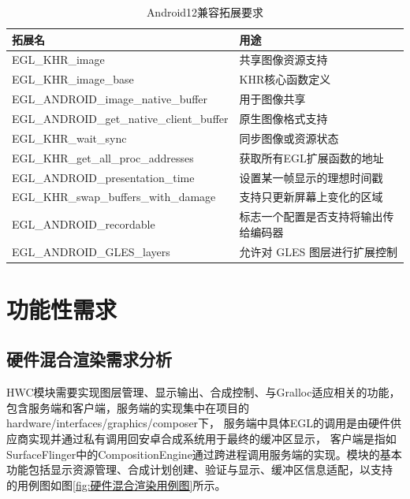 \begin{table}[h]
  \centering
  \caption{Android12兼容拓展要求}
  \label{tab:Android12兼容拓展要求}
  \begin{tabular}{ll}
    \toprule
    拓展名  & 用途\\
    \midrule
    EGL\_KHR\_image & 共享图像资源支持\\
    EGL\_KHR\_image\_base & KHR核心函数定义\\
    EGL\_ANDROID\_image\_native\_buffer & 用于图像共享\\
    EGL\_ANDROID\_get\_native\_client\_buffer & 原生图像格式支持\\
    EGL\_KHR\_wait\_sync & 同步图像或资源状态\\
    EGL\_KHR\_get\_all\_proc\_addresses & 获取所有EGL扩展函数的地址\\
    EGL\_ANDROID\_presentation\_time & 设置某一帧显示的理想时间戳\\
    EGL\_KHR\_swap\_buffers\_with\_damage & 支持只更新屏幕上变化的区域\\
    EGL\_ANDROID\_recordable & 标志一个配置是否支持将输出传给编码器\\
    EGL\_ANDROID\_GLES\_layers & 允许对 GLES 图层进行扩展控制\\
    \bottomrule
  \end{tabular}
  \note{}
\end{table}

\section{功能性需求}


\subsection{硬件混合渲染需求分析}
\label{p:硬件混合渲染需求分析}

HWC模块需要实现图层管理、显示输出、合成控制、与Gralloc适应相关的功能，包含服务端和客户端，服务端的实现集中在项目的{hardware/interfaces/graphics/composer}下，
服务端中具体EGL的调用是由硬件供应商实现并通过私有调用回安卓合成系统用于最终的缓冲区显示\cite{baiget2019architecture}，
客户端是指如SurfaceFlinger中的CompositionEngine通过跨进程调用服务端的实现。模块的基本功能包括显示资源管理、合成计划创建、验证与显示、缓冲区信息适配，以支持
的用例图如图\ref{fig:硬件混合渲染用例图}所示。

